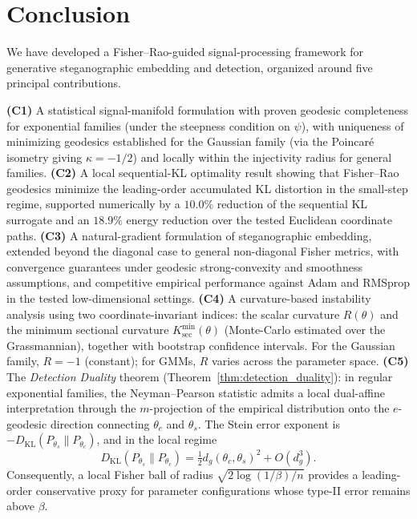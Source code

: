 \documentclass[a4paper,fleqn]{cas-dc}
\begin{document}




\section{Conclusion}
\label{sec:conclusion}

We have developed a Fisher--Rao-guided signal-processing framework for
generative steganographic embedding and detection, organized around five
principal contributions.

\textbf{(C1)} A statistical signal-manifold formulation with proven geodesic completeness
for exponential families (under the steepness condition on $\psi$),
with uniqueness of minimizing geodesics established for the Gaussian
family (via the Poincar\'e isometry giving $\kappa=-1/2$) and locally
within the injectivity radius for general families.
\textbf{(C2)} A local sequential-KL optimality result showing that
Fisher--Rao geodesics minimize the leading-order accumulated KL distortion
in the small-step regime, supported numerically by a $10.0\%$ reduction of
the sequential KL surrogate and an $18.9\%$ energy reduction over the tested
Euclidean coordinate paths.
\textbf{(C3)} A natural-gradient formulation of steganographic embedding,
extended beyond the diagonal case to general non-diagonal Fisher metrics,
with convergence guarantees under geodesic strong-convexity and smoothness
assumptions, and competitive empirical performance against Adam and RMSprop
in the tested low-dimensional settings.
\textbf{(C4)} A curvature-based instability analysis using two
coordinate-invariant indices: the scalar curvature $R(\theta)$ and the
minimum sectional curvature $K_{\sec}^{\min}(\theta)$ (Monte-Carlo
estimated over the Grassmannian), together with bootstrap confidence
intervals.
For the Gaussian family, $R = -1$ (constant); for GMMs, $R$ varies
across the parameter space.
\textbf{(C5)} The \emph{Detection Duality} theorem
(Theorem~\ref{thm:detection_duality}): in regular exponential families,
the Neyman--Pearson statistic admits a local dual-affine interpretation
through the $m$-projection of the empirical distribution onto the
$e$-geodesic direction connecting $\theta_c$ and $\theta_s$.
The Stein error exponent is
$-D_{\mathrm{KL}}(P_{\theta_s}\|P_{\theta_c})$, and in the local regime
\[
D_{\mathrm{KL}}(P_{\theta_s}\|P_{\theta_c})
=
\tfrac{1}{2}d_g(\theta_c,\theta_s)^2 + O(d_g^3).
\]
Consequently, a local Fisher ball of radius
$\sqrt{2\log(1/\beta)/n}$ provides a leading-order conservative proxy for
parameter configurations whose type-II error remains above $\beta$.
\end{document}
